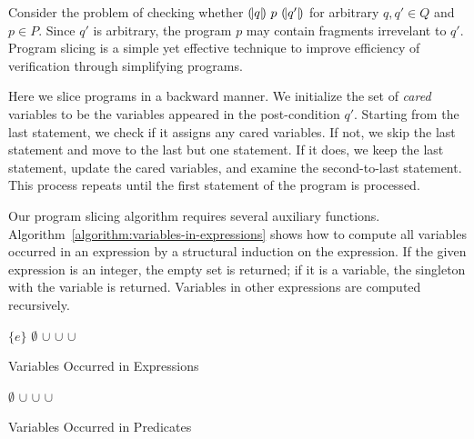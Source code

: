 
Consider the problem of checking whether ${(\!|}{q}{|\!)}~{p}~{(\!|}{q'}{|\!)}$ for
arbitrary $q, q' \in Q$ and $p \in P$. Since $q'$ is arbitrary, the
program $p$ may contain fragments irrevelant to $q'$. Program slicing
is a simple yet effective technique to improve efficiency of
verification through simplifying programs.  

Here we slice programs in a backward manner. We initialize the set
of \emph{cared} variables to be the variables appeared in the
post-condition $q'$. Starting from the last statement, we check if
it assigns any cared variables. If not, we skip the last statement and
move to the last but one statement. If it does, we keep the last
statement, update the cared variables, and examine the second-to-last
statement. This process repeats until the first statement of the
program is processed.

Our program slicing algorithm requires several auxiliary functions. 
Algorithm~\ref{algorithm:variables-in-expressions} shows how to
compute all variables occurred in an expression by a structural
induction on the expression. If the given expression is an integer,
the empty set is returned; if it is a variable, the singleton with the
variable is returned. Variables in other expressions are computed
recursively. 

\begin{algorithm}
  \begin{algorithmic}[1]
      \Case{$\Var$}
        \Return $\{ e \}$
      \EndCase
      \Case{$\Int$}
        \Return $\emptyset$
      \EndCase
        \Return {}
      \EndCase
        \Return {} $\cup$ 
      \EndCase
        \Return {} $\cup$ 
      \EndCase
        \Return {} $\cup$ 
      \EndCase
        \Return {}
      \EndCase
    \EndMatch
    \EndFunction
  \end{algorithmic}
  \caption{Variables Occurred in Expressions}
  \label{algorithm:variables-in-expressions}
\end{algorithm}

\begin{algorithm}
\begin{algorithmic}[1]
    \Case{$\top$}
      $\emptyset$
    \EndCase
      \Return {} $\cup$ 
    \EndCase
      \Return {} $\cup$ 
    \EndCase
      \Return {} $\cup$ 
    \EndCase
  \EndMatch
  \EndFunction
\end{algorithmic}
\caption{Variables Occurred in Predicates}
\label{algorithm:variables-in-predicates}
\end{algorithm}

